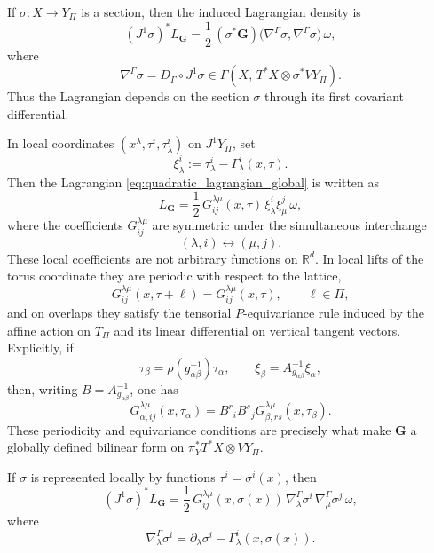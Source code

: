 \documentclass[11pt]{amsart}
\theoremstyle{plain}
\theoremstyle{definition}
\theoremstyle{remark}
\begin{document}
If \(\sigma:X\to Y_\Pi\) is a section, then the induced Lagrangian density is
\begin{equation}
	(J^1\sigma)^*L_{\mathbf G}
	=
	\frac12\,(\sigma^*\mathbf G)
	\bigl(\nabla^\Gamma\sigma,\nabla^\Gamma\sigma\bigr)\,\omega,
	\label{eq:quadratic_lagrangian_on_section}
\end{equation}
where
\[
\nabla^\Gamma\sigma
=
D_\Gamma\circ J^1\sigma
\in
\Gamma\!\left(X,\,T^*X\otimes \sigma^*VY_\Pi\right).
\]
Thus the Lagrangian depends on the section \(\sigma\) through its first covariant differential.

In local coordinates \((x^\lambda,\tau^i,\tau^i_\lambda)\) on \(J^1Y_\Pi\), set
\begin{equation}
	\xi^i_\lambda:=\tau^i_\lambda-\Gamma^i_\lambda(x,\tau).
	\label{eq:xi_definition_quadratic}
\end{equation}
Then the Lagrangian \eqref{eq:quadratic_lagrangian_global} is written as
\begin{equation}
	L_{\mathbf G}
	=
	\frac12\,G^{\lambda\mu}_{ij}(x,\tau)\,
	\xi^i_\lambda \xi^j_\mu\,\omega,
	\label{eq:quadratic_lagrangian_local}
\end{equation}
where the coefficients \(G^{\lambda\mu}_{ij}\) are symmetric under the simultaneous interchange
\[
(\lambda,i)\longleftrightarrow(\mu,j).
\]
These local coefficients are not arbitrary functions on \(\mathbb R^d\). In local lifts of the torus coordinate they are periodic with respect to the lattice,
\[
G^{\lambda\mu}_{ij}(x,\tau+\ell)=G^{\lambda\mu}_{ij}(x,\tau),
\qquad \ell\in\Pi,
\]
and on overlaps they satisfy the tensorial \(P\)-equivariance rule induced by the affine action on \(T_\Pi\) and its linear differential on vertical tangent vectors. Explicitly, if
\[
\tau_\beta=\rho(g_{\alpha\beta}^{-1})\tau_\alpha,
\qquad
\xi_\beta=A_{g_{\alpha\beta}}^{-1}\xi_\alpha,
\]
then, writing \(B=A_{g_{\alpha\beta}}^{-1}\), one has
\[
G^{\lambda\mu}_{\alpha,ij}(x,\tau_\alpha)
=
B^r{}_{i}B^s{}_{j}
G^{\lambda\mu}_{\beta,rs}(x,\tau_\beta).
\]
These periodicity and equivariance conditions are precisely what make \(\mathbf G\) a globally defined bilinear form on \(\pi_Y^*T^*X\otimes VY_\Pi\).

If \(\sigma\) is represented locally by functions \(\tau^i=\sigma^i(x)\), then
\begin{equation}
	(J^1\sigma)^*L_{\mathbf G}
	=
	\frac12\,G^{\lambda\mu}_{ij}(x,\sigma(x))\,
	\nabla^\Gamma_\lambda\sigma^i\,
	\nabla^\Gamma_\mu\sigma^j\,\omega,
	\label{eq:quadratic_lagrangian_section_local}
\end{equation}
where
\[
\nabla^\Gamma_\lambda\sigma^i
=
\partial_\lambda\sigma^i-\Gamma^i_\lambda(x,\sigma(x)).
\]
\end{document}
